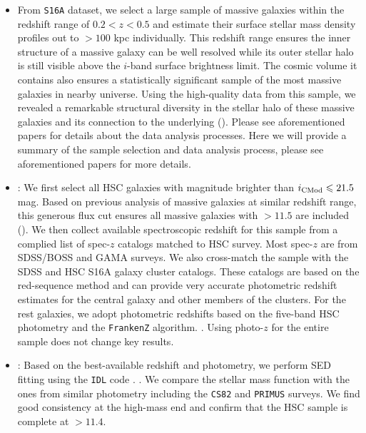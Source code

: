 \documentclass[a4paper,fleqn,usenatbib]{mnras}
\begin{document}
	\begin{itemize}
	
		\item From \texttt{S16A} dataset, we select a large sample of massive galaxies
			within the redshift range of $0.2 < z < 0.5$ and estimate their surface 
			stellar mass density profiles out to $>100$ kpc individually.
			This redshift range ensures the inner structure of a massive galaxy can be 
			well resolved while its outer stellar halo is still visible above the $i$-band
			surface brightness limit. 
			The cosmic volume it contains also ensures a statistically significant sample 
			of the most massive galaxies in nearby universe.
			Using the high-quality data from this sample, we revealed a remarkable structural
			diversity in the stellar halo of these massive galaxies and its connection to 
			the underlying \mhalo{} (\addref{}).
			Please see aforementioned papers for details about the data analysis processes.
			Here we will provide a summary of the sample selection and data analysis 
			process, please see aforementioned papers for more details.
			
		\item {}: We first select all HSC galaxies with \cmodel{} magnitude 
			brighter than $i_{\rm CMod} \leq 21.5$ mag. Based on previous analysis of massive 
			galaxies at similar redshift range, this generous flux cut ensures all massive
			galaxies with \mstar{}$>11.5$ are included (\addref{}).
			We then collect available spectroscopic redshift for this sample from a complied 
			list of spec-$z$ catalogs matched to HSC survey. 
			Most spec-$z$ are from SDSS/BOSS and GAMA surveys.
			We also cross-match the sample with the SDSS \redm{} and HSC S16A \camira{} 
			galaxy cluster catalogs. 
			These catalogs are based on the red-sequence method and can provide very accurate
			photometric redshift estimates for the central galaxy and other members of the
			clusters.
			For the rest galaxies, we adopt photometric redshifts based on the five-band
			HSC \cmodel{} photometry and the \texttt{FrankenZ} algorithm. . Using photo-$z$ for the entire sample 
			does not change key results.
		
		\item {}: Based on the best-available redshift and \cmodel{} photometry, 
			we perform SED fitting using the \texttt{IDL} code \ised{}. 
			.
			We compare the \mcmodel{} stellar mass function with the ones from similar 
			photometry including the \texttt{CS82} and \texttt{PRIMUS} surveys. 
			We find good consistency at the high-mass end and confirm that the HSC 
			sample is complete at \mcmodel{}$>11.4$.
					
	\end{itemize}
\end{document}

